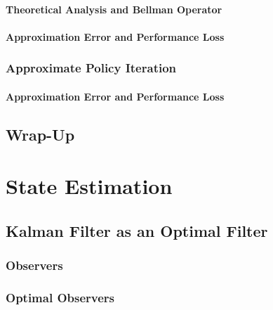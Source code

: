 			\subsubsection{Theoretical Analysis and Bellman Operator} %

			\subsubsection{Approximation Error and Performance Loss} %

		\subsection{Approximate Policy Iteration} %

			\subsubsection{Approximation Error and Performance Loss} %

	\section{Wrap-Up} %

\chapter{State Estimation} %

	\section{Kalman Filter as an Optimal Filter} %

		\subsection{Observers} %

		\subsection{Optimal Observers} %

